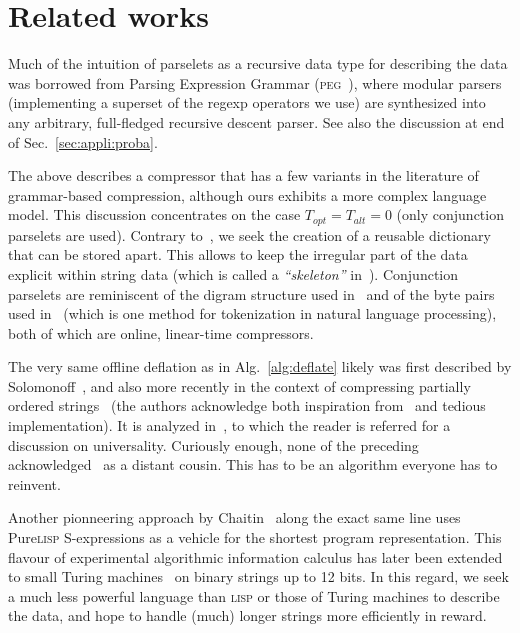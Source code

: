 \section{Related works}
Much of the intuition of parselets as a recursive data type for describing the data was borrowed from Parsing Expression Grammar (\textsc{peg}~\cite{ford:2004}), where modular parsers (implementing a superset of the regexp operators we use) are synthesized into any arbitrary, full-fledged recursive descent parser. See also the discussion at end of Sec.~\ref{sec:appli:proba}.

The above describes a compressor that has a few variants in the literature of grammar-based compression, although ours exhibits a more complex language model. This discussion concentrates on the case $T_{opt}=T_{alt}=0$ (only conjunction parselets are used). Contrary to~\cite{kieffer:yang:2000}, we seek the creation of a reusable dictionary that can be stored apart. This allows to keep the irregular part of the data explicit within string data (which is called a {\em ``skeleton''} in~\cite{storer:1982}). Conjunction parselets are reminiscent of the digram structure used in~\cite{nevill:witten:1997} and of the byte pairs used in~\cite{gage:1994} (which is one method for tokenization in natural language processing), both of which are online, linear-time compressors. 

The very same offline deflation as in Alg.~\ref{alg:deflate} likely was first described by Solomonoff~\cite{solomonoff:1961}, and also more recently in the context of compressing partially ordered strings~\cite[Sec.~3.2]{alur:2003} (the authors acknowledge both inspiration from~\cite{nevill:witten:1997} and tedious implementation). It is analyzed in~\cite{savari:2004}, to which the reader is referred for a discussion on universality. Curiously enough, none of the preceding acknowledged~\cite{solomonoff:1961} as a distant cousin. This has to be an algorithm everyone has to reinvent. 

Another pionneering approach by Chaitin~\cite{chaitin:1987} along the exact same line uses Pure\textsc{lisp} S-expressions as a vehicle for the shortest program representation. This flavour of experimental algorithmic information calculus has later been extended to small Turing machines~\cite{soler:2014} on binary strings up to 12 bits. In this regard, we seek a much less powerful language than \textsc{lisp} or those of Turing machines to describe the data, and hope to handle (much) longer strings more efficiently in reward. 

